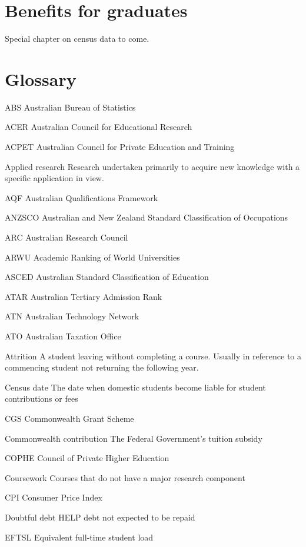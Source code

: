 \documentclass[]{book}
\begin{document}
\hypertarget{benefits-for-graduates}{%
\chapter{Benefits for graduates }\label{benefits-for-graduates}}

Special chapter on census data to come.

\hypertarget{glossary}{%
\chapter{Glossary}\label{glossary}}

ABS Australian Bureau of Statistics

ACER Australian Council for Educational Research

ACPET Australian Council for Private Education and Training

Applied research Research undertaken primarily to acquire new knowledge with a specific application in view.

AQF Australian Qualifications Framework

ANZSCO Australian and New Zealand Standard Classification of Occupations

ARC Australian Research Council

ARWU Academic Ranking of World Universities

ASCED Australian Standard Classification of Education

ATAR Australian Tertiary Admission Rank

ATN Australian Technology Network

ATO Australian Taxation Office

Attrition A student leaving without completing a course. Usually in reference to a commencing student not returning the following year.

Census date The date when domestic students become liable for student contributions or fees

CGS Commonwealth Grant Scheme

Commonwealth contribution The Federal Government's tuition subsidy

COPHE Council of Private Higher Education

Coursework Courses that do not have a major research component

CPI Consumer Price Index

Doubtful debt HELP debt not expected to be repaid

EFTSL Equivalent full-time student load
\end{document}
